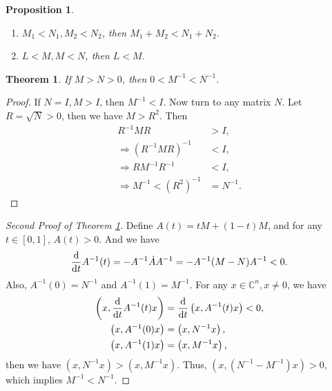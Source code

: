 \documentclass[10pt]{book}
\newtheorem{theorem}{Theorem}[chapter]
\newtheorem{proposition}{Proposition}[chapter]
\theoremstyle{definition}
\numberwithin{equation}{chapter}
\begin{document}
\medskip

\begin{proposition}
~\begin{enumerate}[label=(\alph*)]
    \item $M_1 < N_1, M_2 < N_2$, then $M_1 + M_2 < N_1 + N_2$.
    \item $L < M, M < N$, then $L < M$.
\end{enumerate}
\end{proposition}

\medskip

\begin{theorem}\label{inverse_of_positive_matrix}
If $M > N > 0$, then $0 < M^{-1} < N^{-1}$.
\end{theorem}
\begin{proof}
If $N = I, M > I$, then $M^{-1} < I$. Now turn to any matrix $N$. Let $R = \sqrt{N} > 0$, then we have $M > R^2$. Then
\begin{align*}
    R^{-1} M R & > I, \\
    \Rightarrow \left(R^{-1} M R\right)^{-1} & < I, \\
    \Rightarrow R M^{-1} R^{-1} & < I, \\
    \Rightarrow M^{-1} < \left(R^2\right)^{-1} & = N^{-1}.
\end{align*}
\end{proof}

\begin{proof}[Second Proof of Theorem \ref{inverse_of_positive_matrix}]
Define $A(t) = tM + (1-t)M$, and for any $t\in [0,1]$, $A(t) > 0$. And we have 
\begin{align*}
    \dv{}{t}A^{-1}(t) = - A^{-1} \dot{A} A^{-1} = - A^{-1} (M - N) A^{-1} < 0.
\end{align*}
Also, $A^{-1}(0) = N^{-1}$  and $A^{-1}(1) = M^{-1}$. For any $x\in \mathbb{C}^n, x\neq 0$, we have 
\begin{align*}
    \left(x, \dv{}{t}A^{-1}(t)x \right) & = \dv{}{t} \left(x, A^{-1}(t)x \right) < 0, \\
    \left(x, A^{-1}(0)x \right) & = \left(x, N^{-1}x \right), \\
    \left(x, A^{-1}(1)x \right) & = \left(x, M^{-1}x \right),
\end{align*}
then we have $\left(x, N^{-1}x \right) > \left(x, M^{-1}x \right)$. Thus, $\left(x, (N^{-1} - M^{-1})x \right) > 0$, which implies $M^{-1} < N^{-1}$.
\end{proof}

\medskip
\end{document}

